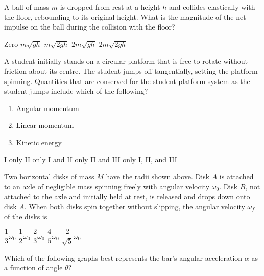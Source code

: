 \documentclass[12pt]{../../oss-apphys-exam}
\begin{document}
\begin{questions}
  \question A ball of mass $m$ is dropped from rest at a height $h$ and collides
  elastically with the floor, rebounding to its original height. What is the
  magnitude of the net impulse on the ball during the collision with the floor?
  \begin{choices}
    \choice Zero
    \choice $m\sqrt{gh}$
    \choice $m\sqrt{2gh}$
    \choice $2m\sqrt{gh}$
    \choice $2m\sqrt{2gh}$
  \end{choices}
  \newpage
  
  \question A student initially stands on a circular platform that is free to
  rotate without friction about its centre. The student jumps off tangentially,
  setting the platform spinning. Quantities that are conserved for the
  student-platform system as the student jumps include which of the following?
  \begin{enumerate}[nosep]
  \item[I.] Angular momentum
  \item[II.] Linear momentum
  \item[III.] Kinetic energy
  \end{enumerate}  
  \begin{choices}
    \choice I only
    \choice II only
    \choice I and II only
    \choice II and III only
    \choice I, II, and III
  \end{choices}
  \newpage
  
  \question Two horizontal disks of mass $M$ have the radii shown above. Disk
  $A$ is attached to an axle of negligible mass spinning freely with angular
  velocity $\omega_0$. Disk $B$, not attached to the axle and initially held
  at rest, is released and drops down onto disk $A$. When both disks spin
  together without slipping, the angular velocity $\omega_f$ of the disks is
  \begin{choices}
    \choice $\dfrac13\omega_0$
    \choice $\dfrac12\omega_0$
    \choice $\dfrac23\omega_0$
    \choice $\dfrac45\omega_0$
    \choice $\dfrac2{\sqrt5}\omega_0$
  \end{choices}
  \newpage
  
  \question Which of the following graphs best represents the bar's angular
  acceleration $\alpha$ as a function of angle $\theta$?


\end{questions}
\end{document}
